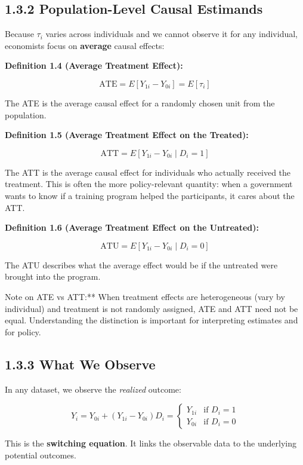 \subsection{1.3.2 Population-Level Causal Estimands}

Because $\tau_i$ varies across individuals and we cannot observe it for any individual, economists focus on \textbf{average} causal effects:

\textbf{Definition 1.4 (Average Treatment Effect):}

\[
\text{ATE} = E[Y_{1i} - Y_{0i}] = E[\tau_i]
\]

The ATE is the average causal effect for a randomly chosen unit from the population.

\textbf{Definition 1.5 (Average Treatment Effect on the Treated):}

\[
\text{ATT} = E[Y_{1i} - Y_{0i} \mid D_i = 1]
\]

The ATT is the average causal effect for individuals who actually received the treatment. This is often the more policy-relevant quantity: when a government wants to know if a training program helped the participants, it cares about the ATT.

\textbf{Definition 1.6 (Average Treatment Effect on the Untreated):}

\[
\text{ATU} = E[Y_{1i} - Y_{0i} \mid D_i = 0]
\]

The ATU describes what the average effect would be if the untreated were brought into the program.

\begin{keybox}{Note on ATE vs ATT:** When treatment effects are heterogeneous (vary by individual) and treatment is not randomly assigned, ATE and ATT need not be equal. Understanding the distinction is important for interpreting estimates and for policy.}
\end{keybox}

\subsection{1.3.3 What We Observe}

In any dataset, we observe the \textit{realized} outcome:

\[
Y_i = Y_{0i} + (Y_{1i} - Y_{0i}) D_i = \begin{cases} Y_{1i} & \text{if } D_i = 1 \\ Y_{0i} & \text{if } D_i = 0 \end{cases}
\]

This is the \textbf{switching equation}. It links the observable data to the underlying potential outcomes.

